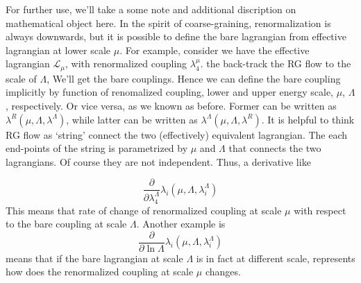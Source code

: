 \documentclass[12pt,halfline,a4paper]{ouparticle}
\begin{document}
For further use, we'll take a some note and additional discription on mathematical object here.
In the spirit of coarse-graining, renormalization is always downwards, but it is possible to define the bare lagrangian from effective lagrangian at lower scale $\mu$.
For example, consider we have the effective lagrangian $\mathcal{L}_\mu$, with renormalized coupling $\lambda_4^\mu$. the back-track the RG flow to the scale of $\Lambda$,
We'll get the bare couplings. Hence we can define the bare coupling implicitly by function of renomalized coupling, lower and upper energy scale, $\mu$, $\Lambda$, respectively.
Or vice versa, as we known as before. Former can be written as $\lambda^R(\mu,\Lambda,\lambda^\Lambda)$, while latter can be written as $\lambda^\Lambda(\mu,\Lambda,\lambda^R)$. It is helpful to think RG flow as `string' connect the two (effectively) equivalent lagrangian. The each end-points of the string is parametrized by $\mu$ and $\Lambda$ that connects the two lagrangians.
Of course they are not independent. Thus, a derivative like

\begin{equation}
	\frac{\partial}{\partial \lambda_4^\Lambda}\lambda_i(\mu,\Lambda,\lambda_i^\Lambda)
\end{equation}
This means that rate of change of renormalized coupling at scale $\mu$ with respect to the bare coupling at scale $\Lambda$.
Another example is 
\begin{equation}
	\frac{\partial}{\partial \ln\Lambda}\lambda_i(\mu,\Lambda,\lambda_i^\Lambda)
\end{equation}
means that if the bare lagrangian at scale $\Lambda$ is in fact at different scale, represents how does the renormalized coupling at scale $\mu$ changes.
\end{document}
